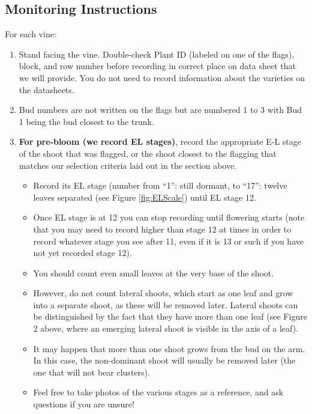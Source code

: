 \documentclass[11pt,letter]{article}
\newenvironment{smitemize}{
\begin{itemize}
  \setlength{\itemsep}{0pt}
  \setlength{\parskip}{0.8pt}
  \setlength{\parsep}{0pt}}
{\end{itemize}
}
\begin{document}
\subsection{Monitoring Instructions}
For each vine:
\begin{enumerate}
\item Stand facing the vine. Double-check Plant ID (labeled on one of the flags), block, and row number before recording in correct place on data sheet that we will provide. You do not need to record information about the varieties on the datasheets.
\item Bud numbers are not written on the flags but are numbered 1 to 3 with Bud 1 being the bud closest to the trunk.
\item {\bf For pre-bloom (we record EL stages)}, record the appropriate E-L stage of the shoot that was flagged, or the shoot closest to the flagging that matches our selection criteria laid out in the section above. 
	\begin{smitemize}
	\item Record its EL stage (number from ``1'': still dormant, to ``17'': twelve leaves separated (see Figure \ref{fig:ELScale}) until EL stage 12. 
	\item Once EL stage is at 12 you can stop recording until flowering starts (note that you may need to record higher than stage 12 at times in order to record whatever stage you see after 11, even if it is 13 or such if you have not yet recorded stage 12).
	\item You should count even small leaves at the very base of the shoot. 
	\item However, do not count lateral shoots, which start as one leaf and grow into a separate shoot, as these will be removed later. Lateral shoots can be distinguished by the fact that they have more than one leaf (see Figure 2 above, where an emerging lateral shoot is visible in the axis of a leaf). 
	\item It may happen that more than one shoot grows from the bud on the arm. In this case, the non-dominant shoot will usually be removed later (the one that will not bear clusters).  
	\item Feel free to take photos of the various stages as a reference, and ask questions if you are unsure! 
	\end{smitemize}
	

\end{enumerate}
\end{document}
